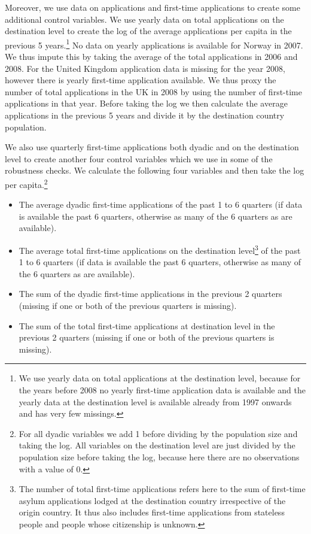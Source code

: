 \documentclass[11pt,a4paper]{scrartcl}
\begin{document}
Moreover, we use data on applications and first-time applications to create some additional control variables. We use yearly data on total applications on the destination level to create the log of the average applications per capita in the previous 5 years.\footnote{We use yearly data on total applications at the destination level, because for the years before 2008 no yearly first-time application data is available and the yearly data at the destination level is available already from 1997 onwards and has very few missings.} No data on yearly applications is available for Norway in 2007. We thus impute this by taking the average of the total applications in 2006 and 2008. For the United Kingdom application data is missing for the year 2008, however there is yearly first-time application available. We thus proxy the number of total applications in the UK in 2008 by using the number of first-time applications in that year. Before taking the log we then calculate the average applications in the previous 5 years and divide it by the destination country population. 

We also use quarterly first-time applications both dyadic and on the destination level to create another four control variables which we use in some of the robustness checks. We calculate the following four variables and then take the log per capita.\footnote{For all dyadic variables we add 1 before dividing by the population size and taking the log. All variables on the destination level are just divided by the population size before taking the log, because here there are no observations with a value of 0.} 
\begin{itemize}
	\itemsep-0.2em
	\item The average dyadic first-time applications of the past 1 to 6 quarters (if data is available the past 6 quarters, otherwise as many of the 6 quarters as are available).
	\item  The average total first-time applications on the destination level\footnote{The number of total first-time applications refers here to the sum of first-time asylum applications lodged at the destination country irrespective of the origin country. It thus also includes first-time applications from stateless people and people whose citizenship is unknown.} of the past 1 to 6 quarters (if data is available the past 6 quarters, otherwise as many of the 6 quarters as are available).
	\item The sum of the dyadic first-time applications in the previous 2 quarters (missing if one or both of the previous quarters is missing).
	\item The sum of the total first-time applications at destination level in the previous 2 quarters (missing if one or both of the previous quarters is missing).
\end{itemize}
\end{document}
